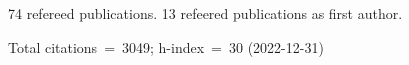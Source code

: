 74 refereed publications. 13 refeered publications as first author.

Total citations~=~3049; h-index~=~30 (2022-12-31)